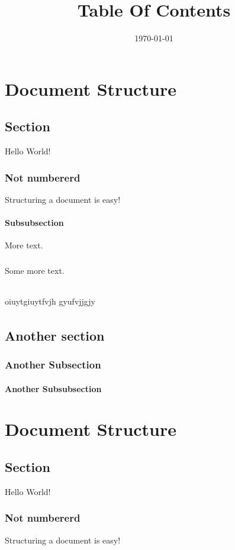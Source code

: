 \documentclass{book}
\title{Table Of Contents}
\date{\today}
\begin{document}
	\maketitle
	\tableofcontents

	\listoffigures
	
	\listoftables
\chapter{Document Structure}
	\section{Section}
	Hello World!
	\subsection*{Not numbererd}
	Structuring a document is easy!
	\subsubsection{Subsubsection}
	More text.
	\paragraph{}
	Some more text.
	\subparagraph{}
	oiuytgiuytfvjh gyufvjjgjy
	
	\subparagraph{}
	\lipsum[1]
	\section{Another section}
	\subsection{Another Subsection}
	\subsubsection{Another Subsubsection}
	\lipsum[1-3]
\chapter{Document Structure}
	\section{Section}
	Hello World!
	\subsection*{Not numbererd}
	Structuring a document is easy!
\end{document}
